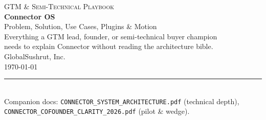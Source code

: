 \documentclass[11pt,a4paper,openany]{book}
\begin{document}
\begin{titlepage}
\pagecolor{MidnightBlue}
\color{white}
\vspace*{2cm}
\begin{center}
  {\fontsize{11}{13}\selectfont\scshape\color{white!70} GTM \& Semi-Technical Playbook}\\[1.2cm]
  {\fontsize{36}{42}\selectfont\bfseries Connector OS}\\[0.3cm]
  {\fontsize{18}{22}\selectfont\color{white!88} Problem, Solution, Use Cases, Plugins \& Motion}\\[1.8cm]
  {\large\color{white!82}
    Everything a GTM lead, founder, or semi-technical buyer champion\\[4pt]
    needs to explain Connector without reading the architecture bible.}\\[2cm]
  {\large\color{white!78} GlobalSushrut, Inc.}\\[0.3cm]
  {\normalsize\color{white!62} \today}
\end{center}
\vfill
\noindent\color{white!35}\rule{\textwidth}{0.4pt}\\[3pt]
{\footnotesize\color{white!55}
  Companion docs: \texttt{CONNECTOR\_SYSTEM\_ARCHITECTURE.pdf} (technical depth),
  \texttt{CONNECTOR\_COFOUNDER\_CLARITY\_2026.pdf} (pilot \& wedge).}
\end{titlepage}
\nopagecolor
\color{black}

\frontmatter
\tableofcontents

\mainmatter







\end{document}
